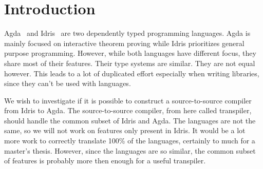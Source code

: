 \documentclass[parskip=half]{scrartcl}
\begin{document}

%
%
%


%

\section{Introduction}

Agda~\cite{agda} and Idris~\cite{idris} are two dependently typed programming
languages.  Agda is mainly focused on interactive theorem proving while Idris
prioritizes general purpose programming.  However, while both languages have
different focus, they share most of their features. Their type systems are
similar. They are not equal however. This leads to a lot of duplicated effort
especially when writing libraries, since they can't be used with languages.


We wish to investigate if it is possible to construct a source-to-source
compiler from Idris to Agda. The source-to-source compiler, from here called
transpiler, should handle the common subset of Idris and Agda. The languages
are not the same, so we will not work on features only present in Idris. It
would be a lot more work to correctly translate 100\% of the languages,
certainly to much for a master's thesis. However, since the languages are so
similar, the common subset of features is probably more then enough for
a useful transpiler.
\end{document}
